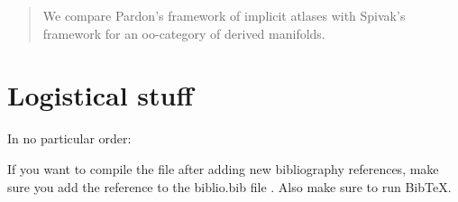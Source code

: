 \documentclass[12pt]{article}
\title{}
\author{Jacob McNamara and Hiro Lee Tanaka}
\theoremstyle{definition}
\begin{document}
\maketitle

\begin{abstract}
We compare Pardon's framework of implicit atlases with Spivak's framework for an oo-category of derived manifolds.
\end{abstract}

\section{Logistical stuff}
In no particular order:
\enum
	\item
		If you want to compile the file after adding new bibliography references, make sure you add the reference to the biblio.bib file . Also make sure to run BibTeX.
\enumd








\end{document}
